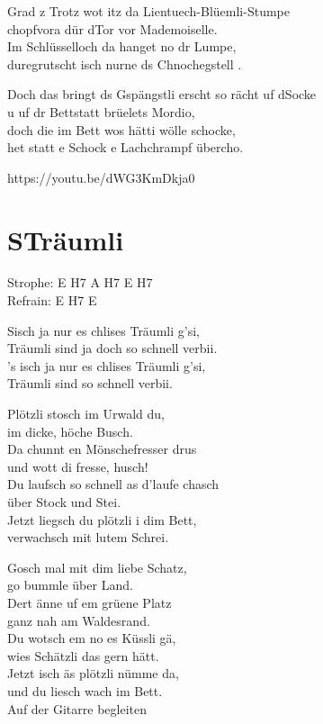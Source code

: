 \documentclass[
  letterpaper,
  twoside=false]{scrbook}
\begin{document}
Grad z Trotz wot itz da Lientuech-Blüemli-Stumpe\\
chopfvora dür d\textquotesingle Tor vor Mademoiselle.\\
Im Schlüsselloch da hanget no dr Lumpe,\\
duregrutscht isch nurne ds Chnochegstell .

Doch das bringt ds Gspängstli erscht so rächt uf
d\textquotesingle Socke\\
u uf dr Bettstatt brüelet\textquotesingle s Mordio,\\
doch die im Bett wo\textquotesingle s hätti wölle schocke,\\
het statt e Schock e Lachchrampf übercho.

https://youtu.be/dWG3KmDkja0

\hypertarget{struxe4umli}{%
\chapter{S\textquotesingle Träumli}\label{struxe4umli}}

Strophe: E H7 A H7 E H7\\
Refrain: E H7 E

S\textquotesingle isch ja nur es chlises Träumli g'si,\\
Träumli sind ja doch so schnell verbii.\\
's isch ja nur es chlises Träumli g'si,\\
Träumli sind so schnell verbii.

Plötzli stosch im Urwald du,\\
im dicke, höche Busch.\\
Da chunnt en Mönschefresser drus\\
und wott di fresse, husch!\\
Du laufsch so schnell as d'laufe chasch\\
über Stock und Stei.\\
Jetzt liegsch du plötzli i dim Bett,\\
verwachsch mit lutem Schrei.

Gosch mal mit dim liebe Schatz,\\
go bummle über Land.\\
Dert änne uf em grüene Platz\\
ganz nah am Waldesrand.\\
Du wotsch em no es Küssli gä,\\
wies Schätzli das gern hätt.\\
Jetzt isch äs plötzli nümme da,\\
und du liesch wach im Bett.\\
Auf der Gitarre begleiten
\end{document}
